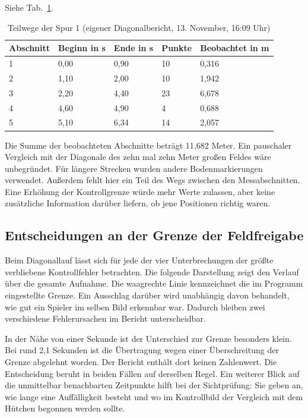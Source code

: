 Siehe Tab.~\ref{tab:em-diagonal}.
\begin{table}[htbp]\centering\caption{Teilwege der Spur 1 (eigener Diagonalbericht, 13. November, 16:09 Uhr)}\label{tab:em-diagonal}
\begin{tabular}{@{}lllll@{}}\toprule Abschnitt & Beginn in s & Ende in s & Punkte & Beobachtet in m\\\midrule
1 & 0,00 & 0,90 & 10 & 0,316\\
2 & 1,10 & 2,00 & 10 & 1,942\\
3 & 2,20 & 4,40 & 23 & 6,678\\
4 & 4,60 & 4,90 & 4 & 0,688\\
5 & 5,10 & 6,34 & 14 & 2,057\\\bottomrule\end{tabular}\end{table}
Die Summe der beobachteten Abschnitte beträgt 11,682 Meter. Ein pauschaler Vergleich mit der Diagonale des zehn mal zehn Meter großen Feldes wäre unbegründet. Für längere Strecken wurden andere Bodenmarkierungen verwendet. Außerdem fehlt hier ein Teil des Wegs zwischen den Messabschnitten. Eine Erhöhung der Kontrollgrenze würde mehr Werte zulassen, aber keine zusätzliche Information darüber liefern, ob jene Positionen richtig waren.


\subsection{Entscheidungen an der Grenze der Feldfreigabe}
Beim Diagonallauf lässt sich für jede der vier Unterbrechungen der größte verbliebene Kontrollfehler betrachten. Die folgende Darstellung zeigt den Verlauf über die gesamte Aufnahme. Die waagrechte Linie kennzeichnet die im Programm eingestellte Grenze. Ein Ausschlag darüber wird unabhängig davon behandelt, wie gut ein Spieler im selben Bild erkennbar war. Dadurch bleiben zwei verschiedene Fehlerursachen im Bericht unterscheidbar.

In der Nähe von einer Sekunde ist der Unterschied zur Grenze besonders klein. Bei rund 2,1 Sekunden ist die Übertragung wegen einer Überschreitung der Grenze abgelehnt worden. Der Bericht enthält dort keinen Zahlenwert. Die Entscheidung beruht in beiden Fällen auf derselben Regel. Ein weiterer Blick auf die unmittelbar benachbarten Zeitpunkte hilft bei der Sichtprüfung: Sie geben an, wie lange eine Auffälligkeit besteht und wo im Kontrollbild der Vergleich mit dem Hütchen begonnen werden sollte.

